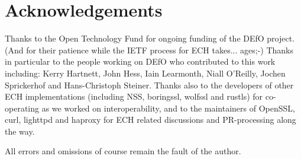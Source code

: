 \section*{Acknowledgements}

Thanks to the Open Technology Fund for ongoing funding of the DEfO
project. (And for their patience while the IETF process for ECH takes...
ages;-)
Thanks in particular to the people working on DEfO who contributed to this work
including:
Kerry Hartnett,
John Hess,
Iain Learmonth,
Niall O'Reilly,
Jochen Sprickerhof
and Hans-Christoph Steiner.
Thanks also to the developers of other ECH implementations (including
NSS, boringssl, wolfssl and rustls) for co-operating as we worked on
interoperability, and to the maintainers of OpenSSL, curl, lighttpd
and haproxy for ECH related discussions and PR-processing along the way.

All errors and omissions of course remain the fault of the author.
